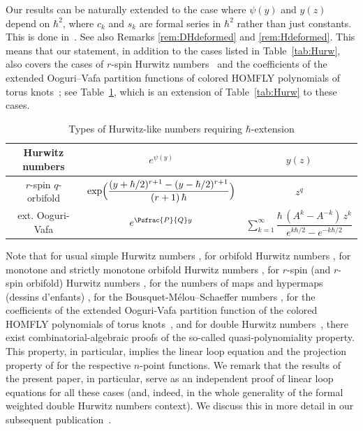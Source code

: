 \begin{remark}
Our results can be naturally extended to the case where $\psi(y)$ and $y(z)$ depend on $\hbar^2$, \ie where $c_k$ and $s_k$ are formal series in $\hbar^2$ rather than just constants. This is done in~\cite{BDKS21toprec}. See also Remarks \ref{rem:DHdeformed} and \ref{rem:Hdeformed}. This means that our statement, in addition to the cases listed in Table~\ref{tab:Hurw}, also covers \eg the cases of $r$-spin
Hurwitz numbers~\cite{KLPS19} and the coefficients of the extended Ooguri--Vafa partition functions of colored HOMFLY polynomials of torus knots~\cite{DPSS,DKPSS}; see Table~\ref{tab:Hurwext}, which is an extension of Table~\ref{tab:Hurw} to these cases.
\begin{table}[htb]
\caption{Types of Hurwitz-like numbers requiring $\hbar$-extension}
\label{tab:Hurwext}
\renewcommand{\arraystretch}{2.5}
\begin{tabular}{|c|c|c|}
\hline
Hurwitz numbers & $e^{\psi(y)}$ & $y(z)$\\
\hline
\hline
$r$-spin $q$-orbifold & $\exp\Bigl(\dfrac{(y+\hbar/2)^{r+1}-(y-\hbar/2)^{r+1}}{(r+1)\,\hbar}\Bigr)$ & $z^q$\\
\hline
ext. Ooguri-Vafa
& $e^{\Psfrac{P}{Q}y}$ & $\sum_{k=1}^\infty \dfrac{\hbar\,(A^k-A^{-k})\, z^k}{
e^{k\hbar/2}-e^{-k\hbar/2}
}$\\
\hline
\end{tabular}
\end{table}
\end{remark}

\begin{remark}\label{rem:combalg}
Note that for usual simple Hurwitz numbers \cite{DKOSS,KLS}, for orbifold Hurwitz numbers \cite{DLPS,KLS}, for monotone and strictly monotone orbifold Hurwitz numbers \cite{KLS}, for $r$-spin (and $r$-spin orbifold) Hurwitz numbers \cite{KLPS19}, for the numbers of maps and hypermaps (dessins d'enfants) \cite{KZ2015}, for the Bousquet-Mélou--Schaeffer numbers \cite{BDS}, for the coefficients of the extended Ooguri-Vafa partition function of the colored HOMFLY polynomials of torus knots~\cite{DPSS}, and for double Hurwitz numbers~\cite{BDKLM}, there \hbox{exist} combinatorial-algebraic proofs of the so-called quasi-polynomiality property. This property, in particular, implies the linear loop equation and the projection property of \cite{BS17} for the respective $n$-point functions. We remark that the results of the present paper, in particular, serve as an independent proof of linear loop equations for all these cases (and, indeed, in the whole generality of the formal weighted double Hurwitz numbers context). We discuss this in more detail in our subsequent publication~\cite{BDKS21toprec}.
\end{remark}

